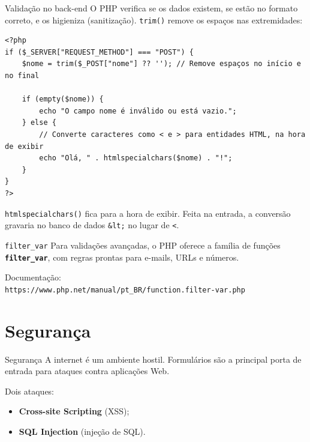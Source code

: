 \documentclass{beamer}
\begin{document}
\begin{frame}[fragile]{Validação no back-end}
	O PHP verifica se os dados existem, se estão no formato correto, e os
	higieniza (sanitização). \texttt{trim()} remove os espaços nas extremidades:

	\begin{verbatim}
<?php
if ($_SERVER["REQUEST_METHOD"] === "POST") {
    $nome = trim($_POST["nome"] ?? ''); // Remove espaços no início e no final

    if (empty($nome)) {
        echo "O campo nome é inválido ou está vazio.";
    } else {
        // Converte caracteres como < e > para entidades HTML, na hora de exibir
        echo "Olá, " . htmlspecialchars($nome) . "!";
    }
}
?>
	\end{verbatim}

	\texttt{htmlspecialchars()} fica para a hora de exibir. Feita na entrada, a
	conversão gravaria no banco de dados \texttt{\&lt;} no lugar de
	\texttt{<}.
\end{frame}

\begin{frame}{\texttt{filter\_var}}
	Para validações avançadas, o PHP oferece a família de funções
	\textbf{\texttt{filter\_var}}, com regras prontas para e-mails, URLs e
	números.

	\vspace{0.3cm}
	Documentação:\\
	{\small\mbox{\texttt{https://www.php.net/manual/pt\_BR/function.filter-var.php}}}
\end{frame}

\section{Segurança}

\begin{frame}{Segurança}
	A internet é um ambiente hostil. Formulários são a principal porta de
	entrada para ataques contra aplicações Web.

	\vspace{0.3cm}
	Dois ataques:
	\begin{itemize}
		\item \textbf{Cross-site Scripting} (XSS);
		\item \textbf{SQL Injection} (injeção de SQL).
	\end{itemize}
\end{frame}
\end{document}
